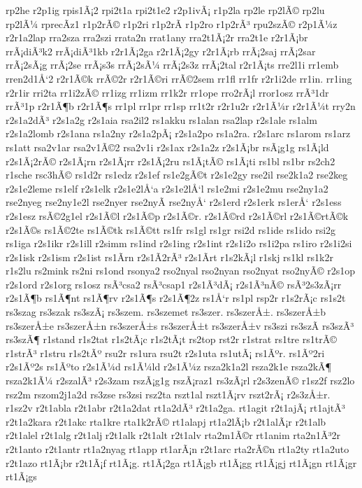 {rp2he
r2p1ig
rpis1Ã¡2
rpi2t1a
rpi2t1e2
r2p1ivÃ¡
r1p2la
rp2le
rp2lÃ©
rp2lu
rp2lÃ¼
rprecÃ­z1
r1p2rÃ©
r1p2ri
r1p2rÃ­
r1p2ro
r1p2rÃ³
rpu2szÃ©
r2p1Ã¼z
r2r1a2lap
rra2sza
rra2szi
rrata2n
rrat1any
rra2t1Ã¡2r
rra2t1e
r2r1Ã¡br
rrÃ¡diÃ³k2
rrÃ¡diÃ³1kb
r2r1Ã¡2ga
r2r1Ã¡2gy
r2r1Ã¡rb
rrÃ¡2saj
rrÃ¡2sar
rrÃ¡2sÃ¡g
rrÃ¡2se
rrÃ¡s3s
rrÃ¡2sÃ¼
rrÃ¡2s3z
rrÃ¡2tal
r2r1Ã¡ts
rre2l1i
rr1emb
rren2d1Å‘2
r2r1Ã©k
rrÃ©2r
r2r1Ã©ri
rrÃ©2sem
rr1fl
rr1fr
r2r1i2de
rr1in.
rr1ing
r2r1ir
rri2ta
rr1i2zÃ©
rr1izg
rr1izm
rr1k2r
rr1ope
rro2rÃ¡l
rror1osz
rrÃ³1dr
rrÃ³1p
r2r1Ã¶b
r2r1Ã¶s
rr1pl
rr1pr
rr1sp
rr1t2r
r2r1u2r
r2r1Ã¼r
r2r1Ã¼t
rry2n
r2s1a2dÃ³
r2s1a2g
r2s1aia
rsa2il2
rs1akku
rs1alan
rsa2lap
r2s1ale
rs1alm
r2s1a2lomb
r2s1ana
rs1a2ny
r2s1a2pÃ¡
r2s1a2po
rs1a2ra.
r2s1arc
rs1arom
rs1arz
rs1att
rsa2v1ar
rsa2v1Ã©2
rsa2v1i
r2s1ax
r2s1a2z
r2s1Ã¡br
rsÃ¡g1g
rs1Ã¡ld
r2s1Ã¡2rÃ©
r2s1Ã¡rn
r2s1Ã¡rr
r2s1Ã¡2ru
rs1Ã¡tÃ©
rs1Ã¡ti
rs1bl
rs1br
rs2ch2
r1sche
rsc3hÃ©
rs1d2r
rs1edz
r2s1ef
rs1e2gÃ©t
r2s1e2gy
rse2il
rse2k1a2
rse2keg
r2s1e2leme
rs1elf
r2s1elk
r2s1e2lÅ‘a
r2s1e2lÅ‘l
rs1e2mi
r2s1e2mu
rse2ny1a2
rse2nyeg
rse2ny1e2l
rse2nyer
rse2nyÃ­
rse2nyÅ‘
r2s1erd
r2s1erk
rs1erÅ‘
r2s1ess
r2s1esz
rsÃ©2g1el
r2s1Ã©l
r2s1Ã©p
r2s1Ã©r.
r2s1Ã©rd
r2s1Ã©rl
r2s1Ã©rtÃ©k
r2s1Ã©s
rs1Ã©2te
rs1Ã©tk
rs1Ã©tt
rs1fr
rs1gl
rs1gr
rsi2d
rs1ide
rs1ido
rsi2g
rs1iga
r2s1ikr
r2s1ill
r2simm
rs1ind
r2s1ing
r2s1int
r2s1i2o
rs1i2pa
rs1iro
r2s1i2si
r2s1isk
r2s1ism
r2s1ist
rs1Ã­rn
r2s1Ã­2rÃ³
r2s1Ã­rt
r1s2kÃ¡l
r1skj
rs1kl
rs1k2r
r1s2lu
rs2mink
rs2ni
rs1ond
rsonya2
rso2nyal
rso2nyan
rso2nyat
rso2nyÃ©
r2s1op
r2s1ord
r2s1org
rs1osz
rsÃ³csa2
rsÃ³csap1
r2s1Ã³dÃ¡
r2s1Ã³nÃ©
rsÃ³2s3zÃ¡rr
r2s1Ã¶b
rs1Ã¶nt
rs1Ã¶rv
r2s1Ã¶s
r2s1Ã¶2z
rs1Å‘r
rs1pl
rsp2r
r1s2rÃ¡c
rs1s2t
rs3szag
rs3szak
rs3szÃ¡
rs3szem.
rs3szemet
rs3szer.
rs3szerÅ±.
rs3szerÅ±b
rs3szerÅ±e
rs3szerÅ±n
rs3szerÅ±s
rs3szerÅ±t
rs3szerÅ±v
rs3szi
rs3szÃ­
rs3szÃ³
rs3szÃ¶
r1stand
r1s2tat
r1s2tÃ¡c
r1s2tÃ¡t
rs2top
rst2r
r1strat
rs1tre
rs1trÃ©
r1strÃ³
r1stru
r1s2tÃº
rsu2r
rs1ura
rsu2t
r2s1uta
rs1utÃ¡
rs1Ãºr.
rs1Ãº2ri
r2s1Ãº2s
rs1Ãºto
r2s1Ã¼d
rs1Ã¼ld
r2s1Ã¼z
rsza2k1a2l
rsza2k1e
rsza2kÃ¶
rsza2k1Ã¼
r2szalÃ³
r2s3zam
rszÃ¡g1g
rszÃ¡raz1
rs3zÃ¡rl
r2s3zenÃ©
r1sz2f
rsz2lo
rsz2m
rszom2j1a2d
rs3zse
rs3zsi
rsz2ta
rszt1al
rszt1Ã¡rv
rszt2rÃ¡
r2s3zÅ±r.
r1sz2v
r2t1abla
r2t1abr
r2t1a2dat
rt1a2dÃ³
r2t1a2ga.
rt1agit
r2t1ajÃ¡
rt1ajtÃ³
r2t1a2kara
r2t1akc
rta1kre
rta1k2rÃ©
rt1alapj
rt1a2lÃ¡b
r2t1alÃ¡r
r2t1alb
r2t1alel
r2t1alg
r2t1alj
r2t1alk
r2t1alt
r2t1alv
rta2m1Ã©r
rt1anim
rta2n1Ã³2r
r2t1anto
r2t1antr
rt1a2nyag
rt1app
rt1arÃ¡n
r2t1arc
rta2rÃ©n
rt1a2ty
rt1a2uto
r2t1azo
rt1Ã¡br
r2t1Ã¡f
rt1Ã¡g.
rt1Ã¡2ga
rt1Ã¡gb
rt1Ã¡gg
rt1Ã¡gj
rt1Ã¡gn
rt1Ã¡gr
rt1Ã¡gs
}
